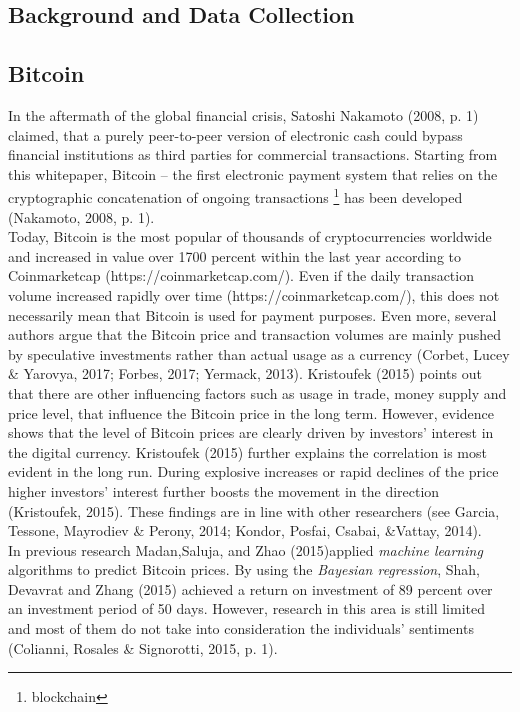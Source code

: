 \documentclass[a4paper,american,12pt]{article}
\begin{document}
\begin{spacing}{1.2}
\clearpage

\section{Background and Data Collection}
\label{sec:Background}
\subsection{Bitcoin}
In the aftermath of the global financial crisis, Satoshi Nakamoto (2008, p. 1) claimed, that a purely peer-to-peer version of electronic cash could bypass financial institutions as third parties for commercial transactions. Starting from this whitepaper, Bitcoin – the first electronic payment system that relies on the cryptographic concatenation of ongoing transactions \footnote{blockchain} has been developed (Nakamoto, 2008, p. 1).\\

Today, Bitcoin is the most popular of thousands of cryptocurrencies worldwide and increased in value over 1700 percent within the last year according to Coinmarketcap (https://coinmarketcap.com/). Even if the daily transaction volume increased rapidly over time (https://coinmarketcap.com/), this does not necessarily mean that Bitcoin is used for payment purposes. Even more, several authors argue that the Bitcoin price and transaction volumes are mainly pushed by speculative investments rather than actual usage as a currency (Corbet, Lucey \& Yarovya, 2017; Forbes, 2017; Yermack, 2013). Kristoufek (2015) points out that there are other influencing factors such as usage in trade, money supply and price level, that influence the Bitcoin price in the long term. However, evidence shows that the level of Bitcoin prices are clearly driven by investors’ interest in the digital currency. Kristoufek (2015) further explains the correlation is most evident in the long run.  During explosive increases or rapid declines of the price higher investors’ interest further boosts the movement in the direction (Kristoufek, 2015). These findings are in line with other researchers (see Garcia, Tessone, Mayrodiev \& Perony, 2014; Kondor, Posfai, Csabai, \&Vattay, 2014).\\

In previous research Madan,Saluja, and Zhao (2015)applied \textit{machine learning} algorithms to predict Bitcoin prices. By using the \textit{Bayesian regression}, Shah, Devavrat and Zhang (2015) achieved a return on investment of 89 percent over an investment period of 50 days. However, research in this area is still limited and most of them do not take into consideration the individuals' sentiments (Colianni, Rosales \& Signorotti, 2015, p. 1).\\


\end{spacing}
\end{document}
